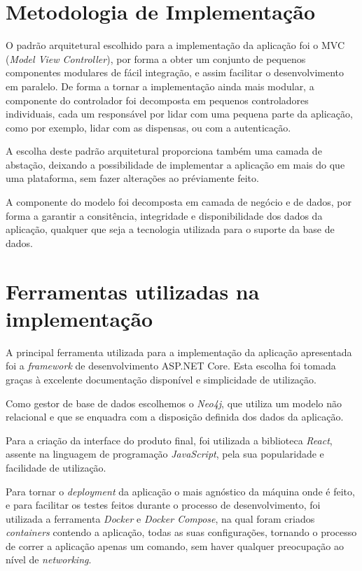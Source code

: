 \documentclass[a4paper]{report}
\begin{document}
\chapter{Metodologia de Implementação}
O padrão arquitetural escolhido para a implementação da aplicação foi o MVC
(\textit{Model View Controller}), por forma a obter um conjunto de pequenos
componentes modulares de fácil integração, e assim facilitar o desenvolvimento 
em paralelo. De forma a tornar a implementação ainda mais modular, a componente
do controlador foi decomposta em pequenos controladores individuais, cada um
responsável por lidar com uma pequena parte da aplicação, como por exemplo,
lidar com as dispensas, ou com a autenticação.

A escolha deste padrão arquitetural proporciona também uma camada de abstação,
deixando a possibilidade de implementar a aplicação em mais do que uma
plataforma, sem fazer alterações ao préviamente feito.

A componente do modelo foi decomposta em camada de negócio e de dados, por forma
a garantir a consitência, integridade e disponibilidade dos dados da aplicação,
qualquer que seja a tecnologia utilizada para o suporte da base de dados.

\chapter{Ferramentas utilizadas na implementação}

A principal ferramenta utilizada para a implementação da aplicação apresentada
foi a \textit{framework} de desenvolvimento ASP.NET Core. Esta escolha foi
tomada graças à excelente documentação disponível e simplicidade de utilização.

Como gestor de base de dados escolhemos o \textit{Neo4j}, que utiliza um modelo
não relacional e que se enquadra com a disposição definida dos dados da
aplicação.

Para a criação da interface do produto final, foi utilizada a biblioteca
\textit{React}, assente na linguagem de programação \textit{JavaScript}, pela
sua popularidade e facilidade de utilização.

Para tornar o \textit{deployment} da aplicação o mais agnóstico da máquina onde
é feito, e para facilitar os testes feitos durante o processo de
desenvolvimento, foi utilizada a ferramenta \textit{Docker} e \textit{Docker
Compose}, na qual foram criados \textit{containers} contendo a aplicação, todas
as suas configurações, tornando o processo de correr a aplicação apenas um
comando, sem haver qualquer preocupação ao nível de \textit{networking}.
\end{document}
